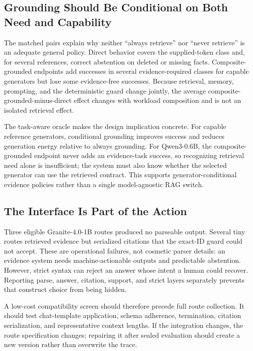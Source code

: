 \subsection{Grounding Should Be Conditional on Both Need and Capability}

The matched pairs explain why neither ``always retrieve'' nor ``never retrieve'' is
an adequate general policy. Direct behavior covers the supplied-token class and,
for several references, correct abstention on deleted or missing facts.
Composite-grounded endpoints add successes in several evidence-required classes
for capable generators but lose some evidence-free successes. Because retrieval,
memory, prompting, and the deterministic guard change jointly, the average
composite-grounded-minus-direct effect changes with workload composition and is not
an isolated retrieval effect.

The task-aware oracle makes the design implication concrete. For capable reference
generators, conditional grounding improves success and reduces generation energy
relative to always grounding. For Qwen3-0.6B, the composite-grounded endpoint never
adds an evidence-task success, so recognizing retrieval need alone is insufficient; the
system must also know whether the selected generator can use the retrieved
contract. This supports generator-conditional evidence policies rather than a
single model-agnostic RAG switch.

\subsection{The Interface Is Part of the Action}

Three eligible Granite-4.0-1B routes produced no parseable output. Several tiny
routes retrieved evidence but serialized citations that the exact-ID guard could
not accept. These are operational failures, not cosmetic parser details: an
evidence system needs machine-actionable outputs and predictable abstention.
However, strict syntax can reject an answer whose intent a human could recover.
Reporting parse, answer, citation, support, and strict layers separately prevents
that construct choice from being hidden.

A low-cost compatibility screen should therefore precede full route collection.
It should test chat-template application, schema adherence, termination, citation
serialization, and representative context lengths. If the integration changes,
the route specification changes; repairing it after sealed evaluation should create
a new version rather than overwrite the trace.

